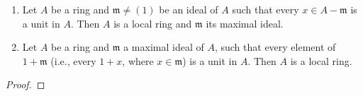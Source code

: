 \begin{proposition}
\begin{enumerate}[noitemsep,label=(\roman*)]
\item Let $A$ be a ring and $\mathfrak{m}\neq (1)$ be an ideal of
  $A$ such that every $x\in A-\mathfrak{m}$ is a unit in
  $A$. Then $A$ is a local ring and $\mathfrak{m}$ its maximal
  ideal.
\item Let $A$ be a ring and $\mathfrak{m}$ a maximal ideal of
  $A$, such that every element of $1+\mathfrak{m}$ (i.e., every
  $1+x$, where $x\in\mathfrak{m}$) is a unit in $A$. Then $A$ is
  a local ring.
\end{enumerate}
\end{proposition}
\begin{proof}

\end{proof}

